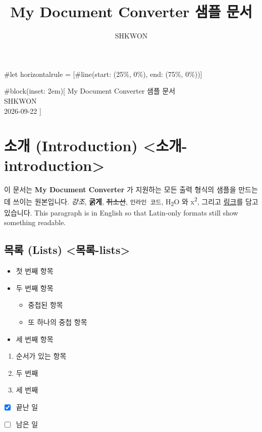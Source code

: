 \documentclass[11pt]{article}
\title{My Document Converter 샘플 문서}
\author{SHKWON}
\date{}
\begin{document}
\maketitle

\#let horizontalrule = [\#line(start: (25\%, 0\%), end: (75\%, 0\%))]

\#block(inset: 2em)[
My Document Converter 샘플 문서
\\

SHKWON
\\

2026-09-22
]

\section*{소개 (Introduction) <소개-introduction>}\label{소개-introduction-소개-introduction}

이 문서는 \textbf{My Document Converter} 가 지원하는 모든 출력 형식의 샘플을 만드는 데 쓰이는
원본입니다.
\emph{강조}, \textbf{굵게}, \sout{취소선}, \verb|인라인 코드|, H\textsubscript{2}O 와
x\textsuperscript{2}, 그리고
\href{https://example.com}{링크}를 담고 있습니다.
This paragraph is in English so that Latin-only formats still show
something readable.

\subsection*{목록 (Lists) <목록-lists>}\label{목록-lists-목록-lists}

\begin{itemize}
\item 첫 번째 항목
\item 두 번째 항목
\begin{itemize}
\item 중첩된 항목
\item 또 하나의 중첩 항목
\end{itemize}
\item 세 번째 항목
\end{itemize}

\begin{enumerate}
\item 순서가 있는 항목
\item 두 번째
\item 세 번째
\end{enumerate}

\begin{itemize}
\item ☒ 끝난 일
\item ☐ 남은 일
\end{itemize}
\end{document}
